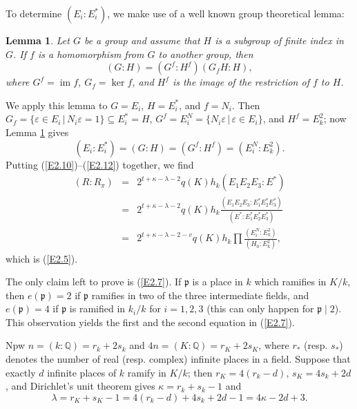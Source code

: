 \documentclass{amsart}
\newcommand{\Q}{\mathbb Q}
\newcommand{\fp}{{\mathfrak p}}
\newcommand{\eps}{\varepsilon}
\newcommand{\sth}{\,|\,}
\newcommand{\im}{\operatorname{im}}
\newtheorem{lemma}{Lemma}
\begin{document}
To determine $(E_i:E_i^*)$, we make use of a well known
group theoretical lemma:

\begin{lemma}\label{L2.13}
Let $G$ be a group and assume that $H$ is a subgroup of
finite index in $G$. If $f$ is a homomorphism from $G$ to
another group, then
$$ (G:H) = (G^f:H^f)(G_fH:H), $$
where $G^f = \im f$, $G_f = \ker f$, and $H^f$ is the image
of the restriction of $f$ to $H$.
\end{lemma}

We apply this lemma to $G = E_i$, $H = E_i^*$, and $f = N_i$.
Then $G_f = \{\eps \in E_i \sth N_i \eps = 1\} \subseteq E_i^* = H$,
$G^f = E_i^N = \{N_i \eps \sth \eps \in E_i\}$, and
$H^f = E_k^2$; now Lemma \ref{L2.13} gives
$$ (E_i:E_i^*) = (G:H) = (G^f:H^f) = (E_i^N:E_k^2).$$
Putting (\ref{E2.10})--(\ref{E2.12}) together, we find
\begin{eqnarray*}
(R:R_\pi) & = & 2^{t+\kappa-\lambda-2} q(K) h_k (E_1E_2E_3:E^*) \\
  & = & 2^{t+\kappa-\lambda-2} q(K) h_k
         \frac{(E_1E_2E_3:E_1^*E_2^*E_3^*)}{(E^*:E_1^*E_2^*E_3^*)} \\
  & = & 2^{t+\kappa-\lambda-2-v} q(K) h_k
           \prod  \frac{(E_i^N:E_k^2)}{(H_0:E_k^2)},
\end{eqnarray*}
which is (\ref{E2.5}).

The only claim left to prove is (\ref{E2.7}). If $\fp$ is a place
in $k$ which ramifies in $K/k$, then $e(\fp) = 2$ if $\fp$ ramifies
in two of the three intermediate fields, and $e(\fp) = 4$ if $\fp$
is ramified in $k_i/k$ for $i = 1, 2, 3$ (this can only happen
for $\fp \mid 2$). This observation yields the first and the
second equation in (\ref{E2.7}).

Npw $n = (k:\Q) = r_k + 2s_k$ and $4n = (K:\Q) = r_K + 2s_K$,
where $r_*$ (resp. $s_*$) denotes the number of real (resp.
complex) infinite places in a field. Suppose that exactly
$d$ infinite places of $k$ ramify in $K/k$; then
$r_K = 4(r_k-d)$, $s_K = 4s_k + 2d$, and Dirichlet's unit
theorem gives $\kappa = r_k+s_k-1$ and
$$ \lambda = r_K + s_K - 1 =
  4(r_k-d) + 4s_k + 2d - 1 = 4\kappa - 2d + 3. $$
\end{document}
